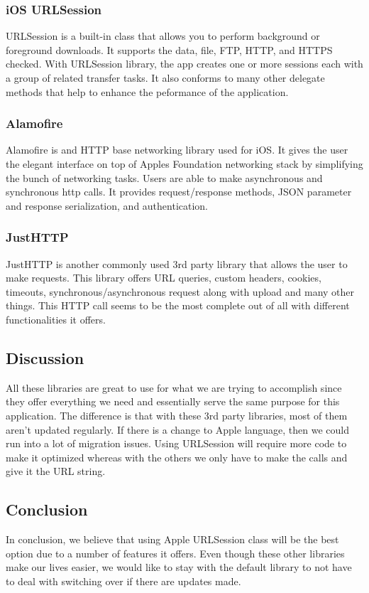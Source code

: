 \documentclass[onecolumn, draftclsnofoot,10pt, compsoc]{IEEEtran}
\begin{document}
\subsubsection{iOS URLSession \cite{URLSession}}
URLSession is a built-in class that allows you to perform background or foreground downloads. It supports the data, file, FTP, HTTP, and HTTPS checked. With URLSession library, the app creates one or more sessions each with a group of related transfer tasks. It also conforms to many other delegate methods that help to enhance the peformance of the application.

\subsubsection{Alamofire\cite{Alamofire}}
\par Alamofire is and HTTP base networking library used for iOS. It gives the user the elegant interface on top of Apples Foundation networking stack by simplifying the bunch of networking tasks. Users are able to make asynchronous and synchronous http calls. It provides request/response methods, JSON parameter and response serialization, and authentication.

\subsubsection{JustHTTP\cite{JustHTTP}}
JustHTTP is another commonly used 3rd party library that allows the user to make requests. This library offers URL queries, custom headers, cookies, timeouts, synchronous/asynchronous request along with upload and many other things. This HTTP call seems to be the most complete out of all with different functionalities it offers. 

\subsection{Discussion}
All these libraries are great to use for what we are trying to accomplish since they offer everything we need and essentially serve the same purpose for this application. The difference is that with these 3rd party libraries, most of them aren't updated regularly. If there is a change to Apple language, then we could run into a lot of migration issues. Using URLSession will require more code to make it optimized whereas with the others we only have to make the calls and give it the URL string.

\subsection{Conclusion}
In conclusion, we believe that using Apple URLSession class will be the best option due to a number of features it offers. Even though these other libraries make our lives easier, we would like to stay with the default library to not have to deal with switching over if there are updates made. 



\end{document}
